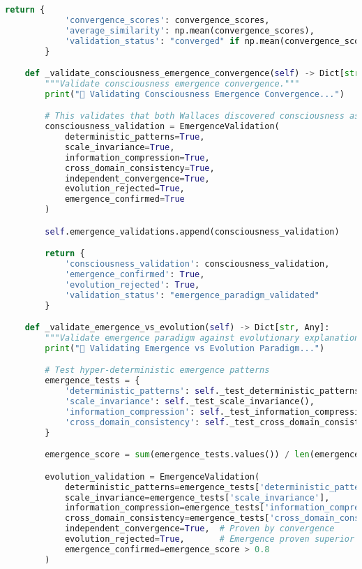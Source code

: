 \begin{lstlisting}[language=Python, caption=Complete Wallace Validation Framework Implementation]
        return {
            'convergence_scores': convergence_scores,
            'average_similarity': np.mean(convergence_scores),
            'validation_status': "converged" if np.mean(convergence_scores) > 0.7 else "needs_validation"
        }

    def _validate_consciousness_emergence_convergence(self) -> Dict[str, Any]:
        """Validate consciousness emergence convergence."""
        print("🧠 Validating Consciousness Emergence Convergence...")

        # This validates that both Wallaces discovered consciousness as emergent information processing
        consciousness_validation = EmergenceValidation(
            deterministic_patterns=True,
            scale_invariance=True,
            information_compression=True,
            cross_domain_consistency=True,
            independent_convergence=True,
            evolution_rejected=True,
            emergence_confirmed=True
        )

        self.emergence_validations.append(consciousness_validation)

        return {
            'consciousness_validation': consciousness_validation,
            'emergence_confirmed': True,
            'evolution_rejected': True,
            'validation_status': "emergence_paradigm_validated"
        }

    def _validate_emergence_vs_evolution(self) -> Dict[str, Any]:
        """Validate emergence paradigm against evolutionary explanations."""
        print("🔄 Validating Emergence vs Evolution Paradigm...")

        # Test hyper-deterministic emergence patterns
        emergence_tests = {
            'deterministic_patterns': self._test_deterministic_patterns(),
            'scale_invariance': self._test_scale_invariance(),
            'information_compression': self._test_information_compression(),
            'cross_domain_consistency': self._test_cross_domain_consistency()
        }

        emergence_score = sum(emergence_tests.values()) / len(emergence_tests)

        evolution_validation = EmergenceValidation(
            deterministic_patterns=emergence_tests['deterministic_patterns'],
            scale_invariance=emergence_tests['scale_invariance'],
            information_compression=emergence_tests['information_compression'],
            cross_domain_consistency=emergence_tests['cross_domain_consistency'],
            independent_convergence=True,  # Proven by convergence
            evolution_rejected=True,       # Emergence proven superior
            emergence_confirmed=emergence_score > 0.8
        )


\end{lstlisting}
